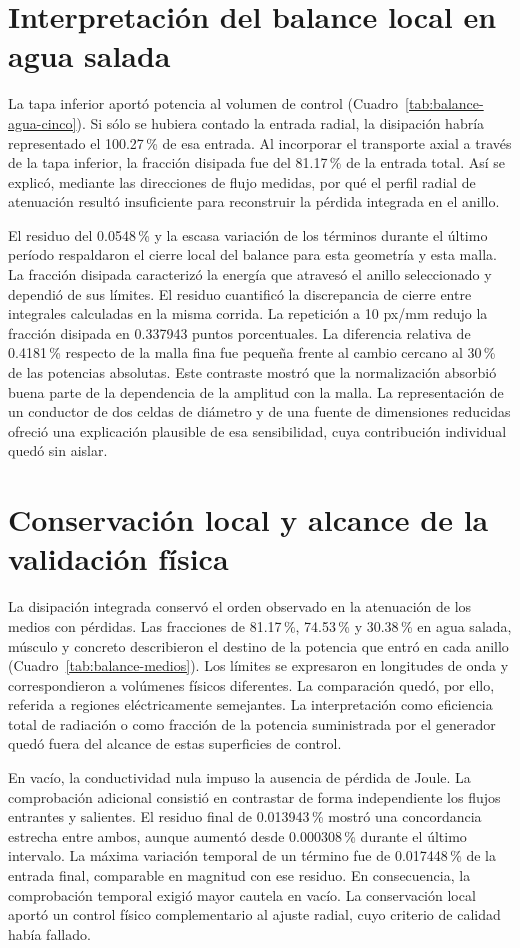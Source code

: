 \section{Interpretación del balance local en agua salada}
La tapa inferior aportó potencia al volumen de control (Cuadro~\ref{tab:balance-agua-cinco}). Si sólo se hubiera contado la entrada radial, la disipación habría representado el 100.27\,\% de esa entrada. Al incorporar el transporte axial a través de la tapa inferior, la fracción disipada fue del 81.17\,\% de la entrada total. Así se explicó, mediante las direcciones de flujo medidas, por qué el perfil radial de atenuación resultó insuficiente para reconstruir la pérdida integrada en el anillo.

El residuo del 0.0548\,\% y la escasa variación de los términos durante el último período respaldaron el cierre local del balance para esta geometría y esta malla. La fracción disipada caracterizó la energía que atravesó el anillo seleccionado y dependió de sus límites. El residuo cuantificó la discrepancia de cierre entre integrales calculadas en la misma corrida. La repetición a 10 px/mm redujo la fracción disipada en 0.337943 puntos porcentuales. La diferencia relativa de 0.4181\,\% respecto de la malla fina fue pequeña frente al cambio cercano al 30\,\% de las potencias absolutas. Este contraste mostró que la normalización absorbió buena parte de la dependencia de la amplitud con la malla. La representación de un conductor de dos celdas de diámetro y de una fuente de dimensiones reducidas ofreció una explicación plausible de esa sensibilidad, cuya contribución individual quedó sin aislar.

\section{Conservación local y alcance de la validación física}
La disipación integrada conservó el orden observado en la atenuación de los medios con pérdidas. Las fracciones de 81.17\,\%, 74.53\,\% y 30.38\,\% en agua salada, músculo y concreto describieron el destino de la potencia que entró en cada anillo (Cuadro~\ref{tab:balance-medios}). Los límites se expresaron en longitudes de onda y correspondieron a volúmenes físicos diferentes. La comparación quedó, por ello, referida a regiones eléctricamente semejantes. La interpretación como eficiencia total de radiación o como fracción de la potencia suministrada por el generador quedó fuera del alcance de estas superficies de control.

En vacío, la conductividad nula impuso la ausencia de pérdida de Joule. La comprobación adicional consistió en contrastar de forma independiente los flujos entrantes y salientes. El residuo final de 0.013943\,\% mostró una concordancia estrecha entre ambos, aunque aumentó desde 0.000308\,\% durante el último intervalo. La máxima variación temporal de un término fue de 0.017448\,\% de la entrada final, comparable en magnitud con ese residuo. En consecuencia, la comprobación temporal exigió mayor cautela en vacío. La conservación local aportó un control físico complementario al ajuste radial, cuyo criterio de calidad había fallado.

